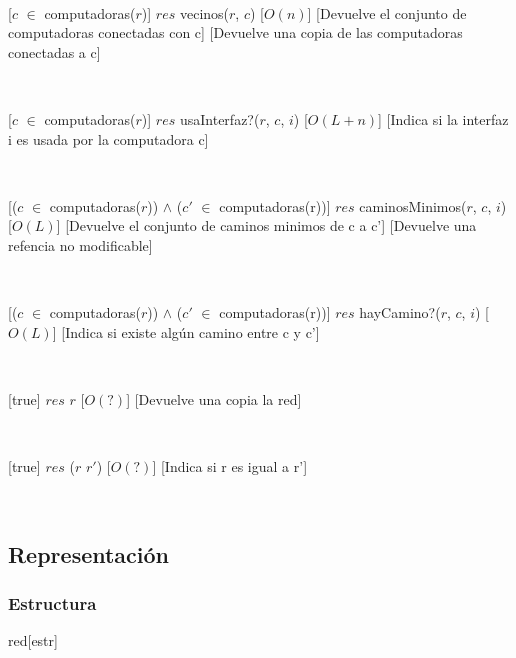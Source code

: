   ~

  [$c$ $\in$ computadoras($r$)]
  {$res$ \igobs vecinos($r$, $c$)}
  [$O(n)$]
  [Devuelve el conjunto de computadoras conectadas con c]
  [Devuelve una copia de las computadoras conectadas a c]

  ~

  [$c$ $\in$ computadoras($r$)]
  {$res$ \igobs usaInterfaz?($r$, $c$, $i$)}
  [$O(L + n)$]
  [Indica si la interfaz i es usada por la computadora c]

  ~

  [($c$ $\in$ computadoras($r$)) $\land$ ($c'$ $\in$ computadoras(r))]
  {$res$ \igobs caminosMinimos($r$, $c$, $i$)}
  [$O(L)$]
  [Devuelve el conjunto de caminos minimos de c a c']
  [Devuelve una refencia no modificable]


  ~

  [($c$ $\in$ computadoras($r$)) $\land$ ($c'$ $\in$ computadoras(r))]
  {$res$ \igobs hayCamino?($r$, $c$, $i$)}
  [$O(L)$]
  [Indica si existe algún camino entre c y c']

  ~

  [true]
  {$res$ \igobs $r$}
  [$O(?)$]
  [Devuelve una copia la red]

  ~

  [true]
  {$res$ \igobs ($r$ \igobs $r'$)}
  [$O(?)$]
  [Indica si r es igual a r']

  ~


\subsection{Representación}

  \subsubsection{Estructura}

    \begin{Estructura}{red}[estr]

      \begin{Tupla}[estr]
      \end{Tupla}

      ~

      \begin{Tupla}[nodoRed]
      \end{Tupla}


    \end{Estructura}

